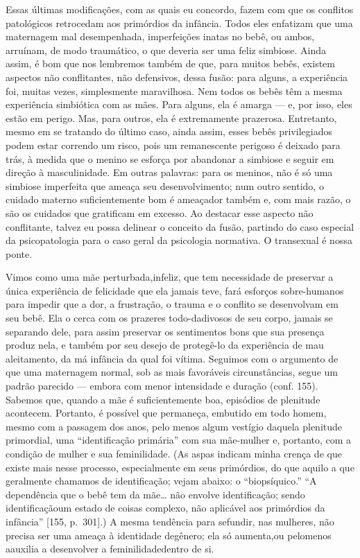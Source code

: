 Essas últimas modificações, com as quais eu concordo, fazem com que
os conflitos patológicos retrocedam aos primórdios da infância. Todos
eles enfatizam que uma maternagem mal desempenhada, imperfeições inatas
no bebê, ou ambos, arruínam, de modo traumático, o que deveria ser uma
feliz simbiose. Ainda assim, é bom que nos lembremos também de que,
para muitos bebês, existem aspectos não conflitantes, não defensivos,
dessa fusão: para alguns, a experiência foi, muitas vezes, simplesmente
maravilhosa. Nem todos os bebês têm a mesma experiência simbiótica com
as mães. Para alguns, ela é amarga --- e, por isso, eles estão em
perigo. Mas, para outros, ela é extremamente prazerosa. Entretanto,
mesmo em se tratando do último caso, ainda assim, esses bebês
privilegiados podem estar correndo um risco, pois um remanescente
perigoso é deixado para trás, à medida que o menino se esforça por
abandonar a simbiose e seguir em direção à masculinidade. Em outras
palavras: para os meninos, não é só uma simbiose imperfeita que ameaça
seu desenvolvimento; num outro sentido, o cuidado materno
suficientemente bom é ameaçador também e, com mais razão, o são os
cuidados que gratificam em excesso. Ao destacar esse aspecto não
conflitante, talvez eu possa delinear o conceito da fusão, partindo do
caso especial da psicopatologia para o caso geral da psicologia
normativa. O transexual é nossa ponte.

Vimos como uma mãe perturbada,\idxmaesfilh[|(] infeliz, que tem necessidade de
preservar a única experiência de felicidade que ela jamais teve, fará
esforços sobre-humanos para impedir que a dor, a frustração, o trauma e
o conflito se desenvolvam em seu bebê. Ela o cerca com os prazeres
todo-dadivosos de seu corpo, jamais se separando dele, para assim
preservar os sentimentos bons que sua presença produz nela, e também
por seu desejo de protegê-lo da experiência de mau aleitamento, da má
infância da qual foi vítima. Seguimos com o argumento de que uma
maternagem normal, sob as mais favoráveis circunstâncias, segue um
padrão parecido --- embora com menor intensidade e duração (conf.
155). Sabemos que, quando a mãe é suficientemente boa, episódios de
plenitude acontecem. Portanto, é possível que permaneça, embutido em
todo homem, mesmo com a passagem dos anos, pelo menos algum vestígio
daquela plenitude primordial, uma ``identificação
primária'' com sua mãe-mulher\idxmaesiden{} e, portanto, com a condição
de mulher e sua feminilidade.\idxmaesdese{} (As aspas indicam minha crença de que
existe mais nesse processo, especialmente em seus primórdios, do que
aquilo a que geralmente chamamos de identificação; vejam abaixo: o
``biopsíquico.'' ``A dependência
que o bebê tem da mãe\ldots{} não envolve identificação; sendo identificação\idxtranseetio[|)]
um estado de coisas complexo, não aplicável aos primórdios da
infância'' [155, p.~301].) A mesma tendência para se\idxtransesimb[|)]
fundir, nas mulheres, não precisa ser uma ameaça à identidade de\idxhomosexpe[|)]
gênero; ela só aumenta,\idxmaestran[|)] ou pelo\idxmascupap[|)] menos a\idxhomoslate[|)] auxilia a desenvolver a
feminilidade\idxmaesfilh[|)] dentro de si.

